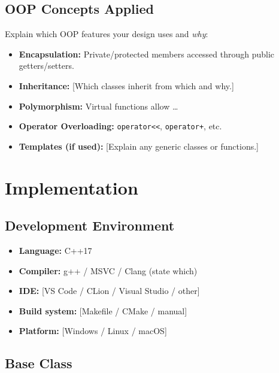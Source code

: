 \documentclass[11pt]{article}
\begin{document}
\subsection{OOP Concepts Applied}
Explain which OOP features your design uses and \emph{why}:

\begin{itemize}
    \item \textbf{Encapsulation:} Private/protected members accessed through public getters/setters.
    \item \textbf{Inheritance:} [Which classes inherit from which and why.]
    \item \textbf{Polymorphism:} Virtual functions allow \ldots
    \item \textbf{Operator Overloading:} \texttt{operator<<}, \texttt{operator+}, etc.
    \item \textbf{Templates (if used):} [Explain any generic classes or functions.]
\end{itemize}

\section{Implementation}

\subsection{Development Environment}
\begin{itemize}
    \item \textbf{Language:} C++17
    \item \textbf{Compiler:} g++ / MSVC / Clang (state which)
    \item \textbf{IDE:} [VS Code / CLion / Visual Studio / other]
    \item \textbf{Build system:} [Makefile / CMake / manual]
    \item \textbf{Platform:} [Windows / Linux / macOS]
\end{itemize}

\subsection{Base Class}
\end{document}
